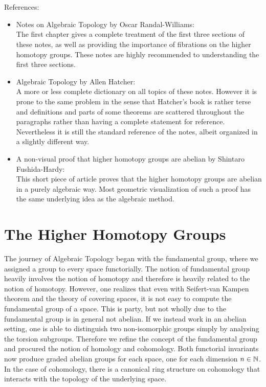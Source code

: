 \documentclass[a4paper]{article}
\begin{document}
~\\~\\
References: 
\begin{itemize}
\item Notes on Algebraic Topology by Oscar Randal-Williams: \\
The first chapter gives a complete treatment of the first three sections of these notes, as well as providing the importance of fibrations on the higher homotopy groups. These notes are highly recommended to understanding the first three sections. 

\item Algebraic Topology by Allen Hatcher: \\
A more or less complete dictionary on all topics of these notes. However it is prone to the same problem in the sense that Hatcher's book is rather terse and definitions and parts of some theorems are scattered throughout the paragraphs rather than having a complete statement for reference. Nevertheless it is still the standard reference of the notes, albeit organized in a slightly different way. 

\item A non-visual proof that higher homotopy groups are abelian by Shintaro Fushida-Hardy: \\
This short piece of article proves that the higher homotopy groups are abelian in a purely algebraic way. Most geometric visualization of such a proof has the same underlying idea as the algebraic method. 
\end{itemize}

\pagebreak
\tableofcontents

\pagebreak

\section{The Higher Homotopy Groups}
The journey of Algebraic Topology began with the fundamental group, where we assigned a group to every space functorially. The notion of fundamental group heavily involves the notion of homotopy and therefore is heavily related to the notion of homotopy. However, one realizes that even with Seifert-van Kampen theorem and the theory of covering spaces, it is not easy to compute the fundamental group of a space. This is party, but not wholly due to the fundamental group is in general not abelian. If we instead work in an abelian setting, one is able to distinguish two non-isomorphic groups simply by analysing the torsion subgroups. Therefore we refine the concept of the fundamental group and procured the notion of homology and cohomology. Both functorial invariants now produce graded abelian groups for each space, one for each dimension $n\in\mathbb{N}$. In the case of cohomology, there is a canonical ring structure on cohomology that interacts with the topology of the underlying space. \\~\\
\end{document}
